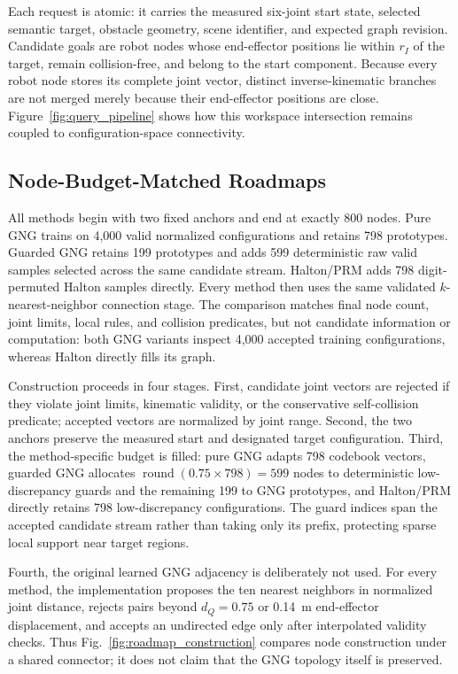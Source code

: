 \documentclass[letterpaper,10pt,conference]{ieeeconf}
\begin{document}
Each request is atomic: it carries the measured six-joint start state, selected semantic target, obstacle geometry, scene identifier, and expected graph revision. Candidate goals are robot nodes whose end-effector positions lie within $r_I$ of the target, remain collision-free, and belong to the start component. Because every robot node stores its complete joint vector, distinct inverse-kinematic branches are not merged merely because their end-effector positions are close. Figure~\ref{fig:query_pipeline} shows how this workspace intersection remains coupled to configuration-space connectivity.

\subsection{Node-Budget-Matched Roadmaps}
All methods begin with two fixed anchors and end at exactly 800 nodes. Pure GNG trains on 4,000 valid normalized configurations and retains 798 prototypes. Guarded GNG retains 199 prototypes and adds 599 deterministic raw valid samples selected across the same candidate stream. Halton/PRM adds 798 digit-permuted Halton samples directly. Every method then uses the same validated $k$-nearest-neighbor connection stage. The comparison matches final node count, joint limits, local rules, and collision predicates, but not candidate information or computation: both GNG variants inspect 4,000 accepted training configurations, whereas Halton directly fills its graph.

Construction proceeds in four stages. First, candidate joint vectors are rejected if they violate joint limits, kinematic validity, or the conservative self-collision predicate; accepted vectors are normalized by joint range. Second, the two anchors preserve the measured start and designated target configuration. Third, the method-specific budget is filled: pure GNG adapts 798 codebook vectors, guarded GNG allocates $\operatorname{round}(0.75\times798)=599$ nodes to deterministic low-discrepancy guards and the remaining 199 to GNG prototypes, and Halton/PRM directly retains 798 low-discrepancy configurations. The guard indices span the accepted candidate stream rather than taking only its prefix, protecting sparse local support near target regions.

Fourth, the original learned GNG adjacency is deliberately not used. For every method, the implementation proposes the ten nearest neighbors in normalized joint distance, rejects pairs beyond $d_Q=0.75$ or 0.14~m end-effector displacement, and accepts an undirected edge only after interpolated validity checks. Thus Fig.~\ref{fig:roadmap_construction} compares node construction under a shared connector; it does not claim that the GNG topology itself is preserved.
\end{document}
